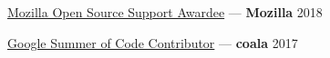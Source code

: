 

\href{https://docs.naveenkumarsangi.me/moss.pdf}{Mozilla Open Source Support Awardee} --- \textbf{Mozilla} \hfill 2018

\href{https://docs.naveenkumarsangi.me/gsoc-mentee.pdf}{Google Summer of Code Contributor} --- \textbf{coala} \hfill 2017

